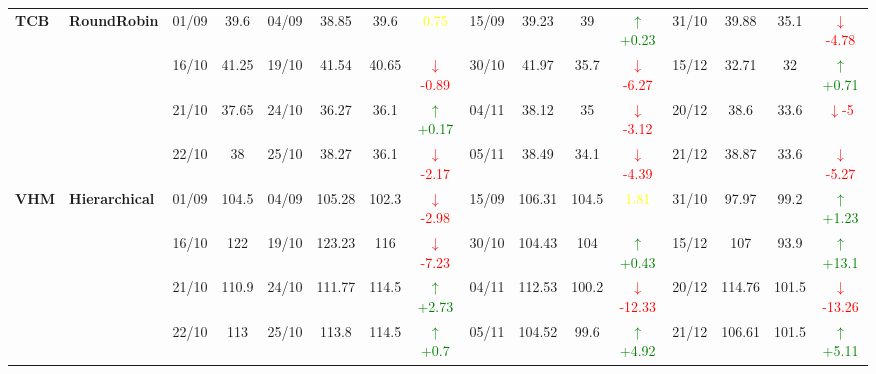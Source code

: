 \documentclass{ieeeaccess}
\begin{document}
{\begin{longtable}{llcc|cccc|cccc|cccc}
\multirow{4}{*}{\textbf{TCB}} 
& \textbf{RoundRobin}
& 01/09 & 39.6 & 04/09 & 38.85 & 39.6 & \textcolor{yellow}{0.75} & 15/09 & 39.23 & 39 & \textcolor{green}{\(\uparrow\)+0.23} & 31/10 & 39.88 & 35.1 & \textcolor{red}{\(\downarrow\)-4.78} \\

&
& 16/10 & 41.25 & 19/10 & 41.54 & 40.65 & \textcolor{red}{\(\downarrow\)-0.89} & 30/10 & 41.97 & 35.7 & \textcolor{red}{\(\downarrow\)-6.27} & 15/12 & 32.71 & 32 & \textcolor{green}{\(\uparrow\)+0.71} \\

&
& 21/10 & 37.65 & 24/10 & 36.27 & 36.1 & \textcolor{green}{\(\uparrow\)+0.17} & 04/11 & 38.12 & 35 & \textcolor{red}{\(\downarrow\)-3.12} & 20/12 & 38.6 & 33.6 &\textcolor{red}{\(\downarrow\)-5}\\

&
& 22/10 & 38 & 25/10 & 38.27 & 36.1 & \textcolor{red}{\(\downarrow\)-2.17} & 05/11 & 38.49 & 34.1 & \textcolor{red}{\(\downarrow\)-4.39} & 21/12 & 38.87 & 33.6 & \textcolor{red}{\(\downarrow\)-5.27} \\
\midrule




\multirow{4}{*}{\textbf{VHM}} 
& \textbf{Hierarchical}
& 01/09 & 104.5 & 04/09 & 105.28 & 102.3 & \textcolor{red}{\(\downarrow\)-2.98} & 15/09 & 106.31 & 104.5 & \textcolor{yellow}{1.81} & 31/10 & 97.97 & 99.2 & \textcolor{green}{\(\uparrow\)+1.23} \\

&
& 16/10 & 122 & 19/10 & 123.23 & 116 & \textcolor{red}{\(\downarrow\)-7.23} & 30/10 & 104.43 & 104 & \textcolor{green}{\(\uparrow\)+0.43} & 15/12 & 107 & 93.9 & \textcolor{green}{\(\uparrow\)+13.1} \\

&
& 21/10 & 110.9 & 24/10 & 111.77 & 114.5 & \textcolor{green}{\(\uparrow\)+2.73} & 04/11 & 112.53 & 100.2 & \textcolor{red}{\(\downarrow\)-12.33} & 20/12 & 114.76 & 101.5 & \textcolor{red}{\(\downarrow\)-13.26} \\

&
& 22/10 & 113 & 25/10 & 113.8 & 114.5 & \textcolor{green}{\(\uparrow\)+0.7} & 05/11 & 104.52 & 99.6 & \textcolor{green}{\(\uparrow\)+4.92} & 21/12 & 106.61 & 101.5 & \textcolor{green}{\(\uparrow\)+5.11} \\
\midrule



\end{longtable}}
\end{document}
